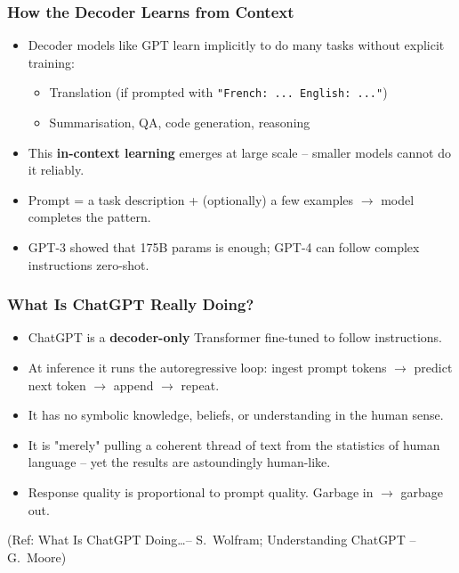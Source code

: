 \begin{frame}[fragile]\frametitle{How the Decoder Learns from Context}
\begin{itemize}
\item Decoder models like GPT learn implicitly to do many tasks without explicit training:
  \begin{itemize}
  \item Translation (if prompted with \texttt{"French: ... English: ..."})
  \item Summarisation, QA, code generation, reasoning
  \end{itemize}
\item This \textbf{in-context learning} emerges at large scale – smaller models cannot do it reliably.
\item Prompt = a task description + (optionally) a few examples $\rightarrow$ model completes the pattern.
\item GPT-3 showed that 175B params is enough; GPT-4 can follow complex instructions zero-shot.
\end{itemize}
\end{frame}

\begin{frame}[fragile]\frametitle{What Is ChatGPT Really Doing?}
\begin{itemize}
\item ChatGPT is a \textbf{decoder-only} Transformer fine-tuned to follow instructions.
\item At inference it runs the autoregressive loop:
  ingest prompt tokens $\rightarrow$ predict next token $\rightarrow$ append $\rightarrow$ repeat.
\item It has no symbolic knowledge, beliefs, or understanding in the human sense.
\item It is "merely" pulling a coherent thread of text from the statistics of human language – yet the results are astoundingly human-like.
\item Response quality is proportional to prompt quality.  Garbage in $\rightarrow$ garbage out.
\end{itemize}
{\tiny (Ref: What Is ChatGPT Doing\ldots – S.\ Wolfram; Understanding ChatGPT – G.\ Moore)}
\end{frame}



